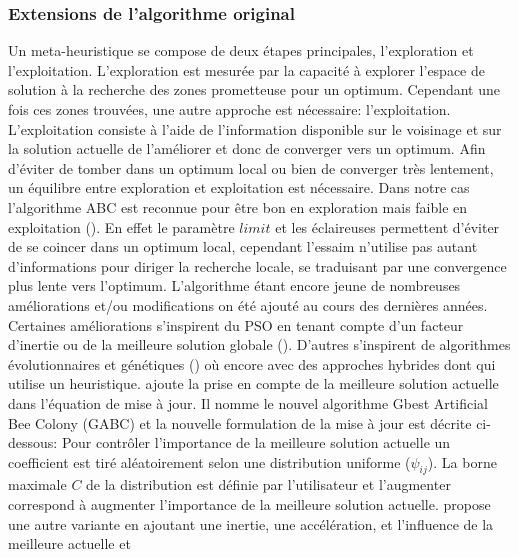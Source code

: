 \subsubsection{Extensions de l’algorithme original} %
\label{ssub:extensions_de_l_algorithme_original}
Un meta-heuristique se compose de deux étapes principales, l’exploration et l’exploitation.
L’exploration est mesurée par la capacité à explorer l’espace de solution à la recherche
des zones prometteuse pour un optimum.
Cependant une fois ces zones trouvées, une autre approche est nécessaire: l’exploitation.
L’exploitation consiste à l’aide de l’information disponible sur le voisinage et sur la solution actuelle
de l’améliorer et donc de converger vers un optimum.
Afin d’éviter de tomber dans un optimum local ou bien de converger très lentement, un équilibre entre exploration et
exploitation est nécessaire.
Dans notre cas l’algorithme ABC est reconnue pour être bon en exploration mais faible en exploitation (\cite{Karaboga2009108,Zhu20103166,Karaboga201221}).
En effet le paramètre $limit$ et les éclaireuses permettent d’éviter de se coincer dans un optimum local, cependant
l’essaim n’utilise pas autant d’informations pour diriger la recherche locale, se traduisant par une convergence
plus lente vers l’optimum.
L’algorithme étant encore jeune de nombreuses améliorations et/ou modifications on été ajouté au cours des dernières années.
Certaines améliorations s’inspirent du PSO en tenant compte d’un facteur d’inertie ou de
la meilleure solution globale (\cite{Lei2010,Zou20109}). D’autres s’inspirent de algorithmes évolutionnaires
et génétiques (\cite{Bi2011174,Zhao2010558}) où encore avec des approches hybrides dont \cite{Pulikanti2009196} qui utilise un heuristique.
\cite{Zhu20103166} ajoute la prise en compte de la meilleure solution actuelle dans l’équation de mise à jour.
Il nomme le nouvel algorithme Gbest Artificial Bee Colony (GABC) et la nouvelle formulation
de la mise à jour est décrite ci-dessous:
Pour contrôler l’importance de la meilleure solution actuelle un coefficient est tiré aléatoirement
selon une distribution uniforme ($\psi_{ij}$). La borne maximale $C$ de la distribution est définie par l’utilisateur et
l’augmenter correspond à augmenter l’importance de la meilleure solution actuelle.
\cite{Li2012320} propose une autre variante en ajoutant une inertie, une accélération, et l’influence de la meilleure actuelle et
